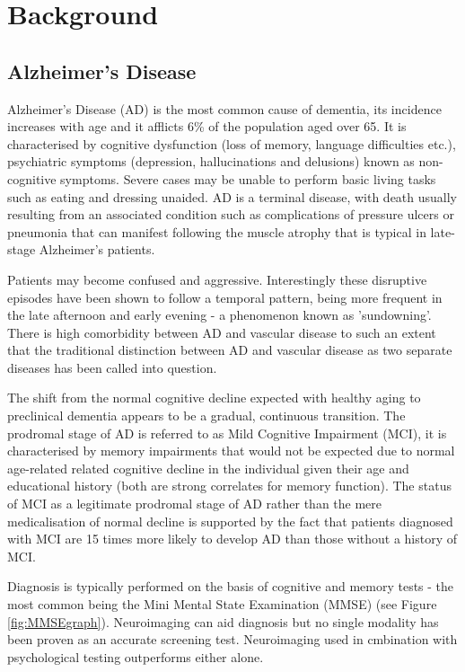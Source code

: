 \chapter{Background}
\section{Alzheimer's Disease}
Alzheimer's Disease (AD) is the most common cause of dementia, its incidence increases with age and it afflicts 6\% of the population aged over 65. \cite{Burns2009} It is characterised by cognitive dysfunction (loss of memory, language difficulties etc.), psychiatric symptoms (depression, hallucinations and delusions) known as non-cognitive symptoms. Severe cases may be unable to perform basic living tasks such as eating and dressing unaided. AD is a terminal disease, with death usually resulting from an associated condition such as complications of pressure ulcers or pneumonia that can manifest following the muscle atrophy that is typical in late-stage Alzheimer's patients.\cite{Burns2009}

Patients may become confused and aggressive. Interestingly these disruptive episodes have been shown to follow a temporal pattern, being more frequent in the late afternoon and early evening - a phenomenon known as 'sundowning'. \cite{McCann2004} There is high comorbidity between AD and vascular disease to such an extent that the traditional distinction between AD and vascular disease as two separate diseases has been called into question.\cite{Stewart2002}

The shift from the normal cognitive decline expected with healthy aging to preclinical dementia appears to be a gradual, continuous transition. The prodromal stage of AD is referred to as Mild Cognitive Impairment (MCI), it is characterised by memory impairments that would not be expected due to normal age-related related cognitive decline in the individual given their age and educational history (both are strong correlates for memory function). The status of MCI as a legitimate prodromal stage of AD rather than the mere medicalisation of normal decline is supported by the fact that patients diagnosed with MCI are 15 times more likely to develop AD than those without a history of MCI.\cite{Burns2009}

Diagnosis is typically performed on the basis of cognitive and memory tests - the most common being the Mini Mental State Examination (MMSE) (see Figure \ref{fig:MMSEgraph}). Neuroimaging can aid diagnosis but no single modality has been proven as an accurate screening test. Neuroimaging used in cmbination with psychological testing outperforms either alone.\cite{Burns2009}


